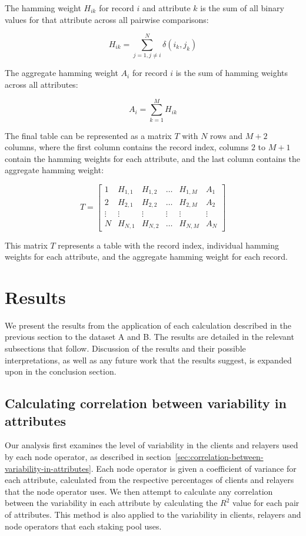 \documentclass[conference]{IEEEtran}
\begin{document}
The hamming weight \( H_{ik} \) for record \( i \) and attribute \( k \) is the sum of all binary values for that attribute across all pairwise comparisons:

\[ H_{ik} = \sum_{j=1, j\neq i}^{N} \delta \left( i_k,j_k \right) \]

The aggregate hamming weight \( A_{i} \) for record \( i \) is the sum of hamming weights across all attributes:

\[ A_{i} = \sum_{k=1}^{M} H_{ik} \]

The final table can be represented as a matrix \( T \) with \( N \) rows and \( M+2 \) columns, where the first column contains the record index, columns \( 2 \) to \( M+1 \) contain the hamming weights for each attribute, and the last column contains the aggregate hamming weight:

\[ T = \begin{bmatrix} 
1 & H_{1,1} & H_{1,2} & \ldots & H_{1,M} & A_{1} \\
2 & H_{2,1} & H_{2,2} & \ldots & H_{2,M} & A_{2} \\
\vdots & \vdots & \vdots & \vdots & \vdots & \vdots \\
N & H_{N,1} & H_{N,2} & \ldots & H_{N,M} & A_{N}
\end{bmatrix} \]

\vspace{2pt}

This matrix \( T \) represents a table with the record index, individual hamming weights for each attribute, and the aggregate hamming weight for each record.

\section{Results}
\label{sec:results}

We present the results from the application of each calculation described in the previous section to the dataset A and B.  The results are detailed in the relevant subsections that follow.  Discussion of the results and their possible interpretations, as well as any future work that the results suggest, is expanded upon in the conclusion section.

\subsection{Calculating correlation between variability in attributes}

Our analysis first examines the level of variability in the clients and relayers used by each node operator, as described in section~\ref{sec:correlation-between-variability-in-attributes}.  Each node operator is given a coefficient of variance for each attribute, calculated from the respective percentages of clients and relayers that the node operator uses. We then attempt to calculate any correlation between the variability in each attribute by calculating the $R^2$ value for each pair of attributes.  This method is also applied to the variability in clients, relayers and node operators that each staking pool uses.
\end{document}
